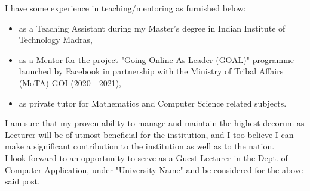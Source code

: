 \documentclass[11pt,a4paper,roman]{moderncv}
\begin{document}
I have some experience in teaching/mentoring  as furnished below:
\vspace{0.5em}
\begin{itemize}
\item as a Teaching Assistant during my Master's degree in Indian Institute of Technology Madras,
\item as a Mentor for the project "Going Online As Leader (GOAL)" programme launched by Facebook in partnership with the Ministry of Tribal Affairs (MoTA) GOI (2020 - 2021),
\item as private tutor for Mathematics and Computer Science related subjects.
\end{itemize}

\vspace{1em}
I am sure that my proven ability to manage and maintain the highest decorum as Lecturer will be of utmost beneficial for the institution, and I too believe I can make a significant contribution to the institution as well as to the nation. \\

\vspace{1em}
I look forward to an opportunity to serve as a Guest Lecturer in the Dept. of Computer Application, under "University Name" and be considered for the above-said post.

\vspace{0.5cm}


\makeletterclosing
\end{document}
